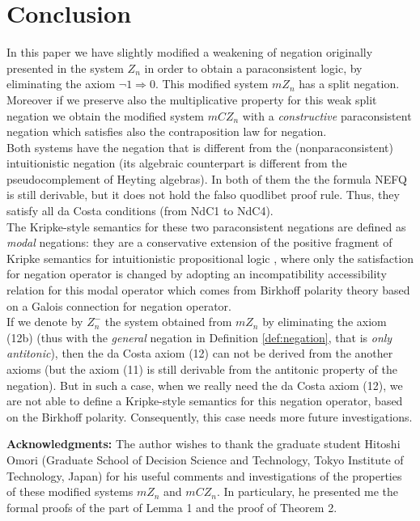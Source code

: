 \documentclass{llncs}
\begin{document}
\section{Conclusion}
In this paper we have slightly modified a weakening of negation
originally presented in the system $Z_n$ \cite{Majk08dc} in order to
obtain a paraconsistent logic, by eliminating the axiom $\neg 1
\Rightarrow 0$. This modified system $mZ_n$ has a split
negation.\\
Moreover if we preserve also the multiplicative property for this
weak  split negation we obtain the modified system $mCZ_n$ with a
\emph{constructive} paraconsistent negation which satisfies also the
contraposition law for negation.\\
Both systems have the negation that is different from the
(nonparaconsistent) intuitionistic negation (its algebraic
counterpart is different from the pseudocomplement of Heyting
algebras).  In both of them  the  the formula NEFQ is still
derivable, but  it does not hold the
falso quodlibet proof rule. Thus, they satisfy all da Costa conditions (from NdC1 to NdC4).\\
The Kripke-style semantics for these two paraconsistent negations
are defined as \emph{modal} negations: they are a conservative
extension of the positive fragment of Kripke semantics for
intuitionistic propositional logic \cite{Majk08dc}, where only the
satisfaction for negation operator is changed by adopting an
incompatibility accessibility relation for this modal operator which
comes from
Birkhoff polarity theory based on a Galois connection for negation operator.\\
If we denote by $Z_n^{-}$ the system obtained from $mZ_n$ by
eliminating the axiom (12b) (thus with the \emph{general} negation
in Definition \ref{def:negation}, that is \emph{only antitonic}),
then the da Costa axiom (12) can not be derived from the another
axioms (but the axiom (11) is still derivable from the antitonic
property of the negation). But in such a case, when we really need
the da Costa axiom (12), we are not able to define a Kripke-style
semantics for this negation operator, based on the Birkhoff
polarity. Consequently, this case needs more future investigations.

\textbf{Acknowledgments:} The author wishes to thank the graduate
student Hitoshi Omori (Graduate School of Decision Science and
Technology, Tokyo Institute of Technology, Japan) for his useful
comments and investigations of the properties of these modified
systems $mZ_n$ and $mCZ_n$. In particulary, he presented me the
formal proofs of the part of Lemma 1 and the proof of Theorem 2.





\end{document}
